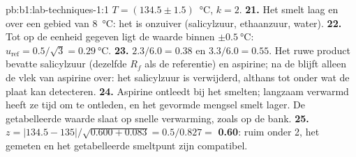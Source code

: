 \begin{solution}{pb:b1:lab-techniques-1:1}
$T = (134.5 \pm 1.5)$~\unit{\celsius}, $k = 2$.
\textbf{21.} Het smelt laag en over een gebied van \qty{8}{\celsius}: het
is onzuiver (salicylzuur, ethaanzuur, water).
\textbf{22.} Tot op de eenheid gegeven ligt de waarde binnen
$\pm\qty{0.5}{\celsius}$: $u_{\mathrm{ref}} = 0.5/\sqrt3 = \qty{0.29}{\celsius}$.
\textbf{23.} $2.3/6.0 = 0.38$ en $3.3/6.0 = 0.55$. Het ruwe product bevatte
salicylzuur (dezelfde $R_f$ als de referentie) en aspirine; na de
 blijft alleen de vlek van aspirine over: het
salicylzuur is verwijderd, althans tot onder wat de plaat kan detecteren.
\textbf{24.} Aspirine ontleedt bij het smelten; langzaam verwarmd heeft
ze tijd om te ontleden, en het gevormde mengsel smelt lager. De
getabelleerde waarde slaat op snelle verwarming, zoals op de bank.
\textbf{25.} $z = |134.5 - 135|/\sqrt{0.600 + 0.083} = 0.5/0.827 =$
\textbf{0.60}: ruim onder 2, het gemeten en het getabelleerde smeltpunt
zijn compatibel.
\end{solution}
